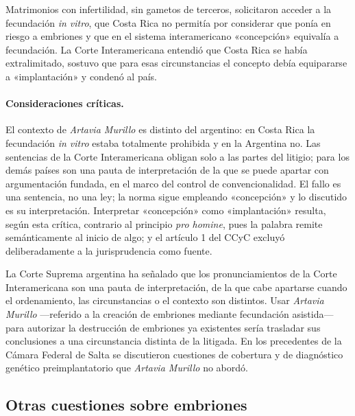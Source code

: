 \documentclass[12pt,oneside]{book}
\begin{document}
\begin{ejemplo}
Matrimonios con infertilidad, sin gametos de terceros, solicitaron acceder a la fecundación \textit{in vitro}, que Costa Rica no permitía por considerar que ponía en riesgo a embriones y que en el sistema interamericano «concepción» equivalía a fecundación. La Corte Interamericana entendió que Costa Rica se había extralimitado, sostuvo que para esas circunstancias el concepto debía equipararse a «implantación» y condenó al país.
\end{ejemplo}

\paragraph{Consideraciones críticas.} El contexto de \textit{Artavia Murillo} es distinto del argentino: en Costa Rica la fecundación \textit{in vitro} estaba totalmente prohibida y en la Argentina no. Las sentencias de la Corte Interamericana obligan solo a las partes del litigio; para los demás países son una pauta de interpretación de la que se puede apartar con argumentación fundada, en el marco del control de convencionalidad. El fallo es una sentencia, no una ley; la norma sigue empleando «concepción» y lo discutido es su interpretación. Interpretar «concepción» como «implantación» resulta, según esta crítica, contrario al principio \textit{pro homine}, pues la palabra remite semánticamente al inicio de algo; y el artículo 1 del CCyC excluyó deliberadamente a la jurisprudencia como fuente.

\begin{importante}
La Corte Suprema argentina ha señalado que los pronunciamientos de la Corte Interamericana son una pauta de interpretación, de la que cabe apartarse cuando el ordenamiento, las circunstancias o el contexto son distintos. Usar \textit{Artavia Murillo} ---referido a la creación de embriones mediante fecundación asistida--- para autorizar la destrucción de embriones ya existentes sería trasladar sus conclusiones a una circunstancia distinta de la litigada. En los precedentes de la Cámara Federal de Salta se discutieron cuestiones de cobertura y de diagnóstico genético preimplantatorio que \textit{Artavia Murillo} no abordó.
\end{importante}

\subsection{Otras cuestiones sobre embriones}
\end{document}
